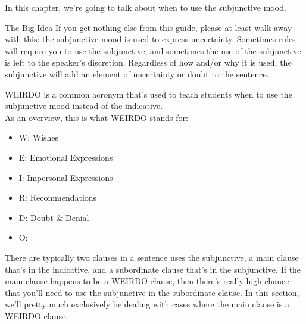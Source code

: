 \label{sec:weirdo}
In this chapter, we're going to talk about when to use the subjunctive mood. 


\begin{conf}{The Big Idea}
If you get nothing else from this guide, please at least walk away with this: the subjunctive mood is used to express uncertainty. Sometimes rules will require you to use the subjunctive, and sometimes the use of the subjunctive is left to the speaker's discretion. Regardless of how and/or why it is used, the subjunctive will add an element of uncertainty or doubt to the sentence. 
\end{conf}

 WEIRDO is a common acronym that's used to teach students when to use the subjunctive mood instead of the indicative. \\ 

As an overview, this is what WEIRDO stands for:
\begin{itemize}[noitemsep]
	\item W: Wishes
	\item E: Emotional Expressions
	\item I: Impersonal Expressions
	\item R: Recommendations
	\item D: Doubt \& Denial
	\item O: 
\end{itemize}

There are typically two clauses in a sentence uses the subjunctive, a main clause that's in the indicative, and a subordinate clause that's in the subjunctive. If the main clause happens to be a WEIRDO clause, then there's really high chance that you'll need to use the subjunctive in the subordinate clause. In this section, we'll pretty much exclusively be dealing with cases where the main clause is a WEIRDO clause. \\

